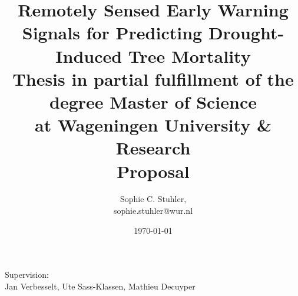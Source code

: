 \documentclass[a4paper]{article}
\title{Remotely Sensed Early Warning Signals for Predicting Drought-Induced Tree Mortality\\
\bigskip
\large{Thesis in partial fulfillment of the degree Master of Science\\
at Wageningen University \& Research}\\
\smallskip
\large{Proposal}}
\date{\today}
\author{Sophie C. Stuhler,\\sophie.stuhler@wur.nl}
\begin{document}
\begin{titlepage} %
	\clearpage
	\vspace{7cm}
	\maketitle %
	\vspace{5mm}
	\begin{center}
	\end{center}
	\vspace{5mm}
	\thispagestyle{empty}
\begin{center}
	
	\bigskip
	\large{
	Supervision:\\
	Jan Verbesselt, Ute Sass-Klassen, Mathieu Decuyper
	}
\end{center}

\end{titlepage}

\newpage %
\tableofcontents


\newpage %

	

\newpage


\newpage


\newpage


\newpage


\newpage


\newpage


\newpage


\newpage


	
\newpage %
\clearpage
{}\label{glossary}
\printglossaries
\newpage %


	
\end{document}
